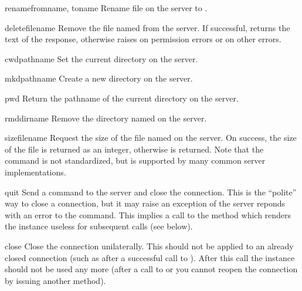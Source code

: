 \begin{methoddesc}{rename}{fromname, toname}
Rename file  on the server to .
\end{methoddesc}

\begin{methoddesc}{delete}{filename}
Remove the file named  from the server.  If successful,
returns the text of the response, otherwise raises
 on permission errors or
 on other errors.
\end{methoddesc}

\begin{methoddesc}{cwd}{pathname}
Set the current directory on the server.
\end{methoddesc}

\begin{methoddesc}{mkd}{pathname}
Create a new directory on the server.
\end{methoddesc}

\begin{methoddesc}{pwd}{}
Return the pathname of the current directory on the server.
\end{methoddesc}

\begin{methoddesc}{rmd}{dirname}
Remove the directory named  on the server.
\end{methoddesc}

\begin{methoddesc}{size}{filename}
Request the size of the file named  on the server.  On
success, the size of the file is returned as an integer, otherwise
 is returned.  Note that the  command is not 
standardized, but is supported by many common server implementations.
\end{methoddesc}

\begin{methoddesc}{quit}{}
Send a  command to the server and close the connection.
This is the ``polite'' way to close a connection, but it may raise an
exception of the server reponds with an error to the
 command.  This implies a call to the 
method which renders the  instance useless for subsequent
calls (see below).
\end{methoddesc}

\begin{methoddesc}{close}{}
Close the connection unilaterally.  This should not be applied to an
already closed connection (such as after a successful call to
).  After this call the  instance should not
be used any more (after a call to  or
 you cannot reopen the connection by issuing another
 method).
\end{methoddesc}

